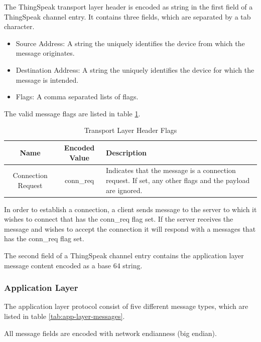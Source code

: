 The ThingSpeak transport layer header is encoded as string in the first field of
a ThingSpeak channel entry. It contains three fields, which are separated by a
tab character.
\begin{itemize}
    \item Source Address: A string the uniquely identifies the device from which
          the message originates.
    \item Destination Address: A string the uniquely identifies the device for
          which the message is intended.
    \item Flags: A comma separated lists of flags.
\end{itemize}

The valid message flags are listed in table \ref{tab:ts-transport-flags}.

\begin{table}[htb]
\centering
\begin{tabular}{ c | c | m{6.0cm} }
\toprule
Name & Encoded Value & Description\\
\midrule
Connection Request & conn\_req & Indicates that the message is a connection
request. If set, any other flags and the payload are ignored.\\
\bottomrule
\end{tabular}
\caption{Transport Layer Header Flags}
\label{tab:ts-transport-flags}
\end{table}

In order to establish a connection, a client sends message to the server to
which it wishes to connect that has the conn\_req flag set. If the server
receives the message and wishes to accept the connection it will respond with a
messages that has the conn\_req flag set.

The second field of a ThingSpeak channel entry contains the application layer
message content encoded as a base 64 string.

\subsubsection{Application Layer}

The application layer protocol consist of five different message types, which
are listed in table \ref{tab:app-layer-messages}.

All message fields are encoded with network endianness (big endian).

